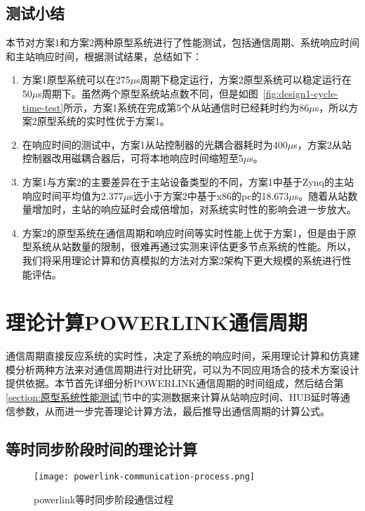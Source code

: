 \subsection{测试小结}
本节对方案1和方案2两种原型系统进行了性能测试，包括通信周期、系统响应时间和主站响应时间，根据测试结果，总结如下：

\begin{enumerate}
  \item 方案1原型系统可以在275$\mu$s周期下稳定运行，方案2原型系统可以稳定运行在50$\mu$s周期下。虽然两个原型系统站点数不同，但是如图~\ref{fig:design1-cycle-time-test}所示，方案1系统在完成第5个从站通信时已经耗时约为86$\mu$s，所以方案2原型系统的实时性优于方案1。
  \item 在响应时间的测试中，方案1从站控制器的光耦合器耗时为400$\mu$s，方案2从站控制器改用磁耦合器后，可将本地响应时间缩短至5$\mu$s。
  \item 方案1与方案2的主要差异在于主站设备类型的不同，方案1中基于Zynq的主站响应时间平均值为2.377$\mu$s远小于方案2中基于x86的pc的18.673$\mu$s。随着从站数量增加时，主站的响应延时会成倍增加，对系统实时性的影响会进一步放大。
  \item 方案2的原型系统在通信周期和响应时间等实时性能上优于方案1，但是由于原型系统从站数量的限制，很难再通过实测来评估更多节点系统的性能。所以，我们将采用理论计算和仿真模拟的方法对方案2架构下更大规模的系统进行性能评估。
\end{enumerate}

\section{理论计算POWERLINK通信周期}

\label{section:理论计算POWERLINK通信周期}
通信周期直接反应系统的实时性，决定了系统的响应时间，采用理论计算和仿真建模分析两种方法来对通信周期进行对比研究，可以为不同应用场合的技术方案设计提供依据。本节首先详细分析POWERLINK通信周期的时间组成，然后结合第\ref{section:原型系统性能测试}节中的实测数据来计算从站响应时间、HUB延时等通信参数，从而进一步完善理论计算方法，最后推导出通信周期的计算公式。

\subsection{等时同步阶段时间的理论计算}

\label{subsection:等时同步阶段时间的理论计算}

\begin{figure}[!htb]
  \centering
  \texttt{[image: powerlink-communication-process.png]}
  \caption{powerlink等时同步阶段通信过程}
  \label{fig:powerlink-communication-process}
\end{figure}

